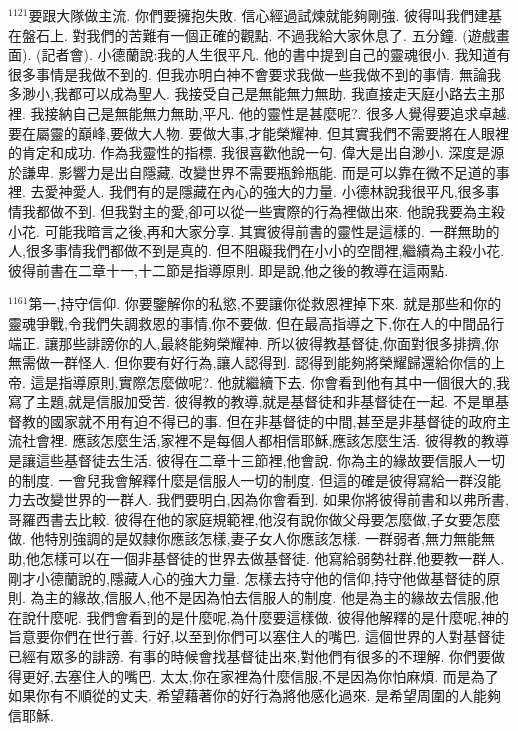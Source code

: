 \documentclass{book}
\begin{document}
$^{1121}$要跟大隊做主流.
你們要擁抱失敗.
信心經過試煉就能夠剛強.
彼得叫我們建基在盤石上.
對我們的苦難有一個正確的觀點.
不過我給大家休息了.
五分鐘.
(遊戲畫面).
(記者會).
小德蘭說:我的人生很平凡.
他的書中提到自己的靈魂很小.
我知道有很多事情是我做不到的.
但我亦明白神不會要求我做一些我做不到的事情.
無論我多渺小,我都可以成為聖人.
我接受自己是無能無力無助.
我直接走天庭小路去主那裡.
我接納自己是無能無力無助,平凡.
他的靈性是甚麼呢?.
很多人覺得要追求卓越.
要在屬靈的巔峰,要做大人物.
要做大事,才能榮耀神.
但其實我們不需要將在人眼裡的肯定和成功.
作為我靈性的指標.
我很喜歡他說一句.
偉大是出自渺小.
深度是源於謙卑.
影響力是出自隱藏.
改變世界不需要瓶鈴瓶能.
而是可以靠在微不足道的事裡.
去愛神愛人.
我們有的是隱藏在內心的強大的力量.
小德林說我很平凡,很多事情我都做不到.
但我對主的愛,卻可以從一些實際的行為裡做出來.
他說我要為主殺小花.
可能我暗言之後,再和大家分享.
其實彼得前書的靈性是這樣的.
一群無助的人,很多事情我們都做不到是真的.
但不阻礙我們在小小的空間裡,繼續為主殺小花.
彼得前書在二章十一,十二節是指導原則.
即是說,他之後的教導在這兩點.

$^{1161}$第一,持守信仰.
你要鑒解你的私慾,不要讓你從救恩裡掉下來.
就是那些和你的靈魂爭戰,令我們失調救恩的事情,你不要做.
但在最高指導之下,你在人的中間品行端正.
讓那些誹謗你的人,最終能夠榮耀神.
所以彼得教基督徒,你面對很多排擠,你無需做一群怪人.
但你要有好行為,讓人認得到.
認得到能夠將榮耀歸還給你信的上帝.
這是指導原則,實際怎麼做呢?.
他就繼續下去.
你會看到他有其中一個很大的,我寫了主題,就是信服加受苦.
彼得教的教導,就是基督徒和非基督徒在一起.
不是單基督教的國家就不用有迫不得已的事.
但在非基督徒的中間,甚至是非基督徒的政府主流社會裡.
應該怎麼生活,家裡不是每個人都相信耶穌,應該怎麼生活.
彼得教的教導是讓這些基督徒去生活.
彼得在二章十三節裡,他會說.
你為主的緣故要信服人一切的制度.
一會兒我會解釋什麼是信服人一切的制度.
但這的確是彼得寫給一群沒能力去改變世界的一群人.
我們要明白,因為你會看到.
如果你將彼得前書和以弗所書,哥羅西書去比較.
彼得在他的家庭規範裡,他沒有說你做父母要怎麼做,子女要怎麼做.
他特別強調的是奴隸你應該怎樣,妻子女人你應該怎樣.
一群弱者,無力無能無助,他怎樣可以在一個非基督徒的世界去做基督徒.
他寫給弱勢社群,他要教一群人.
剛才小德蘭說的,隱藏人心的強大力量.
怎樣去持守他的信仰,持守他做基督徒的原則.
為主的緣故,信服人,他不是因為怕去信服人的制度.
他是為主的緣故去信服,他在說什麼呢.
我們會看到的是什麼呢,為什麼要這樣做.
彼得他解釋的是什麼呢,神的旨意要你們在世行善.
行好,以至到你們可以塞住人的嘴巴.
這個世界的人對基督徒已經有眾多的誹謗.
有事的時候會找基督徒出來,對他們有很多的不理解.
你們要做得更好,去塞住人的嘴巴.
太太,你在家裡為什麼信服,不是因為你怕麻煩.
而是為了如果你有不順從的丈夫.
希望藉著你的好行為將他感化過來.
是希望周圍的人能夠信耶穌.
\end{document}
